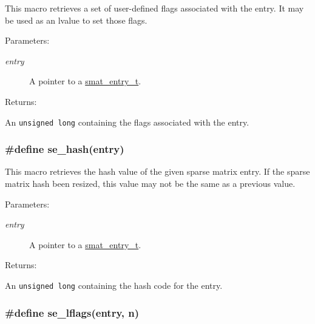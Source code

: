 This macro retrieves a set of user-defined flags associated with the entry. It may be used as an lvalue to set those flags.\begin{Desc}
\item[Parameters: ]\par
\begin{description}
\item[{\em 
entry}]A pointer to a \hyperlink{group__dbprim__smat_a2}{smat\_\-entry\_\-t}.\end{description}
\end{Desc}
\begin{Desc}
\item[Returns: ]\par
An {\tt unsigned long} containing the flags associated with the entry. \end{Desc}
\hypertarget{group__dbprim__smat_a42}{
\subsubsection[se\_\-hash]{\setlength{\rightskip}{0pt plus 5cm}\#define se\_\-hash(entry)}}
\label{group__dbprim__smat_a42}


This macro retrieves the hash value of the given sparse matrix entry. If the sparse matrix hash been resized, this value may not be the same as a previous value.\begin{Desc}
\item[Parameters: ]\par
\begin{description}
\item[{\em 
entry}]A pointer to a \hyperlink{group__dbprim__smat_a2}{smat\_\-entry\_\-t}.\end{description}
\end{Desc}
\begin{Desc}
\item[Returns: ]\par
An {\tt unsigned long} containing the hash code for the entry. \end{Desc}
\hypertarget{group__dbprim__smat_a45}{
\subsubsection[se\_\-lflags]{\setlength{\rightskip}{0pt plus 5cm}\#define se\_\-lflags(entry, n)}}
\label{group__dbprim__smat_a45}


